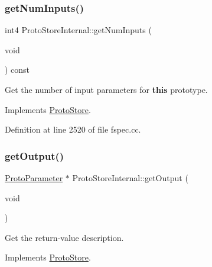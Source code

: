 \mbox{\label{class_proto_store_internal_a3114aa2721c50c2ffa1bca2912d3f5ff}} 
\subsubsection{\texorpdfstring{getNumInputs()}{getNumInputs()}}
{\footnotesize\ttfamily int4 Proto\+Store\+Internal\+::get\+Num\+Inputs (\begin{DoxyParamCaption}\item[{void}]{ }\end{DoxyParamCaption}) const\hspace{0.3cm}{\ttfamily [virtual]}}



Get the number of input parameters for {\bfseries{this}} prototype. 



Implements \mbox{\hyperlink{class_proto_store_a641e1b680e3a7c67b65a964d06d60187}{Proto\+Store}}.



Definition at line 2520 of file fspec.\+cc.

\mbox{\label{class_proto_store_internal_a01b4100ec95fcd835b7f8ae6cad8f796}} 
\subsubsection{\texorpdfstring{getOutput()}{getOutput()}}
{\footnotesize\ttfamily \mbox{\hyperlink{class_proto_parameter}{Proto\+Parameter}} $\ast$ Proto\+Store\+Internal\+::get\+Output (\begin{DoxyParamCaption}\item[{void}]{ }\end{DoxyParamCaption})\hspace{0.3cm}{\ttfamily [virtual]}}



Get the return-\/value description. 



Implements \mbox{\hyperlink{class_proto_store_aeb240f8e1b797060196c4bb7be000197}{Proto\+Store}}.



